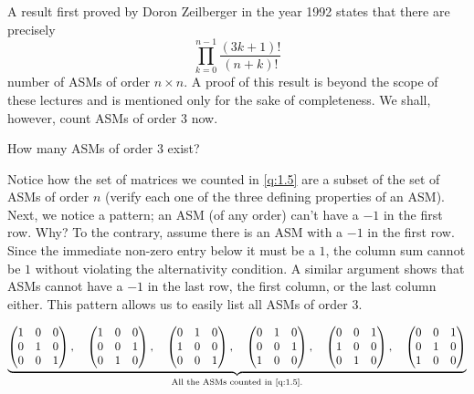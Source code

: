A result first proved by Doron Zeilberger in the year 1992 states that there are precisely  \[
\prod_{k=0}^{n-1} \frac{\left( 3k+1 \right)!}{\left( n+k \right)!}
\] 
number of ASMs of order $n\times n$. A proof of this result is beyond the scope of these lectures and is mentioned only for the sake of completeness. We shall, however, count ASMs of order $3$ now.

\begin{question}
    How many ASMs of order $3$ exist?
\end{question}
Notice how the set of matrices we counted in \cref{q:1.5} are a subset of the set of ASMs of order $n$ (verify each one of the three defining properties of an ASM). Next, we notice a pattern; an ASM (of any order) can't have a $-1$ in the first row. Why? To the contrary, assume there is an ASM with a $-1$ in the first row. Since the immediate non-zero entry below it must be a $1$, the column sum cannot be $1$ without violating the alternativity condition. A similar argument shows that ASMs cannot have a 
$-1$ in the last row, the first column, or the last column either. This pattern allows us to easily list all ASMs of order $3$.

\[
\underbrace{
\begin{pmatrix}
    1 & 0 & 0 \\
    0 & 1 & 0 \\
    0 & 0 & 1
\end{pmatrix},
\quad
\begin{pmatrix}
    1 & 0 & 0 \\
    0 & 0 & 1 \\
    0 & 1 & 0
\end{pmatrix},
\quad
\begin{pmatrix}
    0 & 1 & 0 \\
    1 & 0 & 0 \\
    0 & 0 & 1
\end{pmatrix},
\quad
\begin{pmatrix}
    0 & 1 & 0 \\
    0 & 0 & 1 \\
    1 & 0 & 0
\end{pmatrix},
\quad
\begin{pmatrix}
    0 & 0 & 1 \\
    1 & 0 & 0 \\
    0 & 1 & 0
\end{pmatrix},
\quad
\begin{pmatrix}
    0 & 0 & 1 \\
    0 & 1 & 0 \\
    1 & 0 & 0
\end{pmatrix}
}_{\text{All the ASMs counted in \cref{q:1.5}.}}
\]

